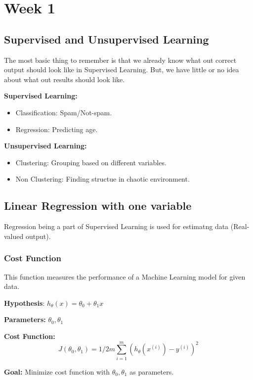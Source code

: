 \documentclass[12pt]{report}
\begin{document}
\tableofcontents

\chapter{Week 1}

\section{Supervised and Unsupervised Learning}
The most basic thing to remember is that we already know what out correct output should look like in Supervised Learning.
But, we have little or no idea about what out results should look like.

\textbf{Supervised Learning:}
\begin{itemize}
	\item Classification: Spam/Not-spam. 
	\item Regression: Predicting age.
\end{itemize}

\textbf{Unsupervised Learning:}
\begin{itemize}
	\item Clustering: Grouping based on different variables.
	\item Non Clustering: Finding structue in chaotic environment.
\end{itemize}

\section{Linear Regression with one variable}
Regression being a part of Supervised Learning is used for estimatng data (Real-valued output).  

\subsection{Cost Function}
 This function measures the performance of a Machine Learning model for given data.

\textbf{Hypothesis}: $ h_ \theta(x) = \theta_0 + \theta_1x $

\textbf{Parameters:} $ \theta_0, \theta_1 $

\textbf{Cost Function:} 
\begin{equation} \label {eq:1}
	J( \theta_0, \theta_1 ) = 1/2m \sum_{i=1}^{m} (h_\theta(x^{(i)})-y^{(i)})^2 
\end{equation} 

\textbf{Goal:} Minimize cost function with $ \theta_0, \theta_1 $ as parameters.
\end{document}
